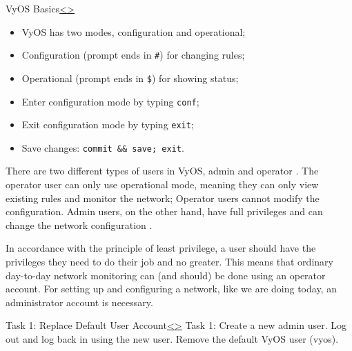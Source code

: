 \documentclass[12pt]{article}
\newenvironment{instructionblock}{\Large\bgroup}{\egroup}
\begin{document}
\pagebreak
\begin{slide}{VyOS Basics}{\hyperref[slide 8]{\textless}\hyperref[slide 10]{\textgreater}}
\begin{instructionblock}
\begin{itemize}
\item VyOS has two modes, configuration and operational;
\item Configuration (prompt ends in \texttt{\#}) for changing rules;
\item Operational (prompt ends in \texttt{\$}) for showing status;
\item Enter configuration mode by typing \texttt{conf};
\item Exit configuration mode by typing \texttt{exit};
\item Save changes: \texttt{commit \&\& save; exit}.
\end{itemize}
\end{instructionblock}
\end{slide}

\par There are two different types of users in VyOS, admin and operator \cite{vyoswiki}. The operator user can only use operational mode, meaning they can only view existing rules and monitor the network; Operator users cannot modify the configuration. Admin users, on the other hand, have full privileges and can change the network configuration \cite{vyoswiki}. 
\par In accordance with the principle of least privilege, a user should have the privileges they need to do their job and no greater. This means that ordinary day-to-day network monitoring can (and should) be done using an operator account. For setting up and configuring a network, like we are doing today, an administrator account is necessary. 

\pagebreak
\begin{slide}{Task 1: Replace Default User Account}{\hyperref[slide 9]{\textless}\hyperref[slide 11]{\textgreater}}
\begin{instructionblock}
Task 1: Create a new admin user. Log out and log back in using the new user. Remove the default VyOS user (vyos). 
\end{instructionblock}
\end{slide}
\end{document}
